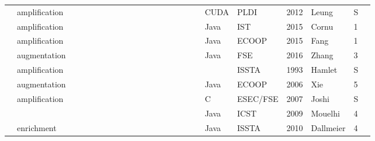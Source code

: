 \begin{table*}
\begin{adjustbox}{max width=\textwidth,center=\textwidth}
\begin{tabular}{l|l|llll|llllll|llllll|l|llll|l}
            \cite{leung12}                                  & amplification                     &    &    & \X &    &    &    & \X &    &    &    &    & \X &    &    &    &    & CUDA        & PLDI                                                     & 2012 & Leung          & S \\
            \cite{cornu2015exception}                       & amplification                     &    &    & \X &    &    &    & \X &    & \X &    &    & \X & \X &    &    &    & Java        & IST                                                      & 2015 & Cornu          & 1 \\
            \cite{fang2015perfblower}                       & amplification                     &    &    & \X &    &    &    & \X &    &    &    &    & \X &    &    &    &    & Java        & ECOOP                                                    & 2015 & Fang           & 1 \\
            \cite{Zhang2016Isomorphic}                      & augmentation                      &    &    & \X &    & \X &    & \X &    &    & \X &    & \X &    &    & \X &    & Java        & FSE                                                      & 2016 & Zhang          & 3 \\
            \cite{HamletV93}                                & amplification                     &    &    &    & \X &    &    &    &    &    & \X &    &    &    &    &    &    &             & ISSTA                                                    & 1993 & Hamlet         & S \\
            \cite{Xie2006}                                  & augmentation                      &    &    &    & \X &    &    &    &    &    &    & \X &    & \X &    &    &    & Java        & ECOOP                                                    & 2006 & Xie            & 5 \\
            \cite{Joshi07}                                  & amplification                     &    &    &    & \X &    &    &    &    &    & \X &    &    &    & \X &    &    & C           & ESEC/FSE                                                 & 2007 & Joshi          & S \\
            \cite{Mouelhi:2009}                             &                                   &    &    &    & \X &    &    &    &    &    & \X & \X &    &    &    &    &    & Java        & ICST                                                     & 2009 & Mouelhi        & 4 \\
            \cite{Dallmeier2010}                            & enrichment                        &    &    &    & \X &    &    &    &    &    & \X & \X &    &    &    &    &    & Java        & ISSTA                                                    & 2010 & Dallmeier      & 4 \\

\end{tabular}
\end{adjustbox}
\end{table*}
